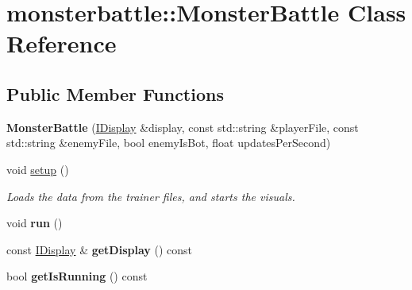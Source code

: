 \hypertarget{classmonsterbattle_1_1MonsterBattle}{}\section{monsterbattle\+:\+:Monster\+Battle Class Reference}
\label{classmonsterbattle_1_1MonsterBattle}
\subsection*{Public Member Functions}
\begin{DoxyCompactItemize}
\item 
\mbox{\label{classmonsterbattle_1_1MonsterBattle_a8e41dcbb9b76fbfc38f149b3111409ab}} 
{\bfseries Monster\+Battle} (\hyperlink{structmonsterbattle_1_1IDisplay}{I\+Display} \&display, const std\+::string \&player\+File, const std\+::string \&enemy\+File, bool enemy\+Is\+Bot, float updates\+Per\+Second)
\item 
void \hyperlink{classmonsterbattle_1_1MonsterBattle_ac06a07fc5c81cab7c03758fdf87b03ea}{setup} ()
\begin{DoxyCompactList}\small\item\em Loads the data from the trainer files, and starts the visuals. \end{DoxyCompactList}\item 
\mbox{\label{classmonsterbattle_1_1MonsterBattle_a6266a1c51290e930dd79899026184a2e}} 
void {\bfseries run} ()
\item 
\mbox{\label{classmonsterbattle_1_1MonsterBattle_a5fb5ce17cd4632ab42c77b4239b94c1c}} 
const \hyperlink{structmonsterbattle_1_1IDisplay}{I\+Display} \& {\bfseries get\+Display} () const
\item 
\mbox{\label{classmonsterbattle_1_1MonsterBattle_ae7de70de80eec17939c9b0185cae03a9}} 
bool {\bfseries get\+Is\+Running} () const
\end{DoxyCompactItemize}
